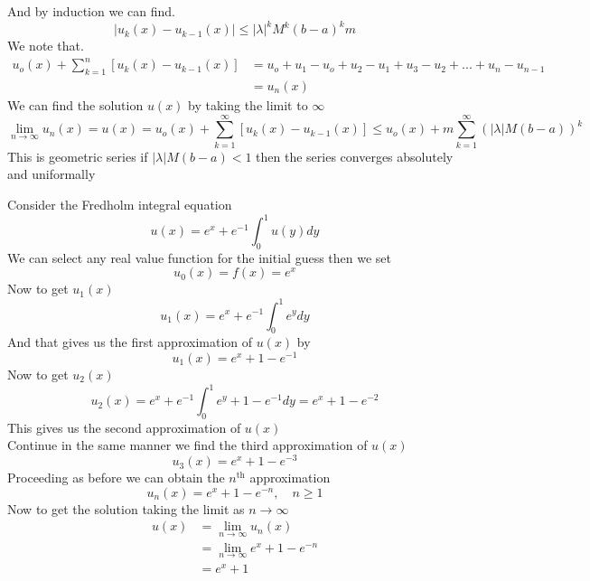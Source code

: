 And by induction we can find.
\[
    |u_{k}(x) - u_{k-1}(x)| \leq |\lambda|^kM^k {(b-a)}^k m    
\]
We note that.
\begin{align*}
u_o(x) + \sum_{k=1}^{n} [u_{k}(x) - u_{k-1}(x)] &= u_o + u_1 - u_o + u_2 - u_1 + u_3 - u_2 + ...+u_n - u_{n-1}
\\
&= u_n(x)
\end{align*}
We can find the solution $u(x)$ by taking the limit to $\infty$
\[
    \lim_{n\to\infty} u_n(x) = u(x) = u_o(x) + \sum_{k=1}^{\infty} [u_{k}(x) - u_{k-1}(x)] \leq u_o(x) + m\sum_{k=1}^{\infty} {(|\lambda|M(b-a))}^k    
\]
This is geometric series if $|\lambda|M(b-a) < 1$ then the series converges absolutely and uniformally
\begin{example}
    Consider the Fredholm integral equation 
    \[
        u(x) = e^x + e^{-1}\int_{0}^{1}u(y)dy    
    \]
    We can select any real value function for the initial guess then we set 
    \[
    u_0(x) =f(x) =e^x 
    \]
    Now to get $u_1(x)$
    \[
        u_1(x) = e^x + e^{-1}\int_{0}^{1}e^y dy        
    \]
    And that gives us the first approximation of $u(x)$ by
    \[
        u_1(x) = e^x + 1 - e^{-1} 
    \]
    Now to get $u_2(x)$
    \[
        u_2(x) = e^x + e^{-1}\int_{0}^{1}e^y + 1 - e^{-1}dy = e^x + 1 - e^{-2}
    \]
    This gives us the second approximation of $u(x)$
    \\
    Continue in the same manner we find the third approximation of $u(x)$
    \[
        u_3(x) = e^x + 1 - e^{-3}
    \]
    Proceeding as before we can obtain the $n^{\text{th}}$ approximation
    \[
        u_n(x) = e^x + 1 - e^{-n} , \quad n \geq 1
    \]
    Now to get the solution taking the limit as $n \to \infty$
    \begin{align*}
        u(x) &= \lim_{n\to\infty} u_n(x)
        \\
        &= \lim_{n\to\infty} e^x + 1 - e^{-n}
        \\
        &= e^x + 1
    \end{align*}
\end{example}
